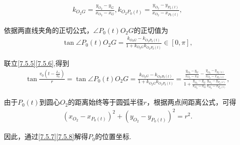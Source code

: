 \documentclass[../main.tex]{subfiles}
\begin{document}
        \begin{align}
            k_{O_2G}=\frac{y_{O_2}-y_G}{x_{O_2}-x_G},k_{O_2P_0\left( t \right)}=\frac{y_{O_2}-y_{P_0\left( t \right)}}{x_{O_2}-x_{P_0\left( t \right)}},\label{7.5.6}
        \end{align}
        \par 依据两直线夹角的正切公式，\(\angle P_{0}(t)O_{2}G\)的正切值为
\begin{align}
    \tan \angle P_0\left( t \right) O_2G=\frac{k_{O_2G}-k_{O_2P_0\left( t \right)}}{1+k_{O_2G}k_{O_2P_0\left( t \right)}}\in \left[ 0,\pi \right] ,\label{7.5.6}
\end{align}
\par 联立\eqref{7.5.5}\eqref{7.5.6},得到
        \begin{align}
            \tan \frac{v_0\left( t-\frac{L_1}{v_0} \right)}{r}=\tan \angle P_0\left( t \right) O_2G=\frac{k_{O_2G}-k_{O_2P_0\left( t \right)}}{1+k_{O_2G}k_{O_2P_0\left( t \right)}}=\frac{\frac{y_{O_2}-y_G}{x_{O_2}-x_G}-\frac{y_{O_2}-y_{P_0\left( t \right)}}{x_{O_2}-x_{P_0\left( t \right)}}}{1+\frac{y_{O_2}-y_G}{x_{O_2}-x_G}\frac{y_{O_2}-y_{P_0\left( t \right)}}{x_{O_2}-x_{P_0\left( t \right)}}},\label{7.5.7}
        \end{align}
\par 由于$P_{0}(t)$到圆心$O_{2}$的距离始终等于圆弧半径\(r\)，根据两点间距离公式，可得
\begin{align}
    \left( x_{O_2}-x_{P_0\left( t \right)} \right) ^2+\left( y_{O_2}-y_{P_0\left( t \right)} \right) ^2=r^2.\label{7.5.8}
\end{align} 

\par 因此，通过\eqref{7.5.7}\eqref{7.5.8}解得$P_0$的位置坐标.  
\end{document}
